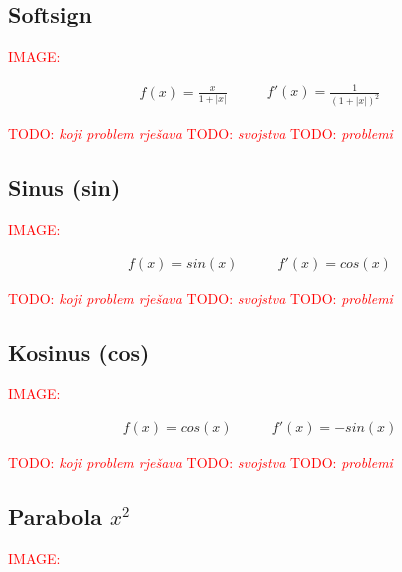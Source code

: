 \documentclass[times, utf8, diplomski]{fer}
\def\TODO#1{\noindent\textcolor{red}{TODO: \textit{#1}}\newline}
\def\todo#1{\TODO{#1}}
\def\todoimg#1{\begin{center} \textcolor{red}{IMAGE: \textit{#1}} \end{center}}
\begin{document}
\subsection*{Softsign}

\todoimg{}

\begin{equation}
\begin{split}
f(x) = \frac{x}{1+|x|}
\end{split}
\qquad
\begin{split}
f'(x) = \frac{1}{(1+|x|)^2}
\end{split}
\end{equation}

\todo{koji problem rješava}
\todo{svojstva}
\todo{problemi}

\subsection*{Sinus (sin)}

\todoimg{}

\begin{equation}
\begin{split}
f(x) = sin(x)
\end{split}
\qquad
\begin{split}
f'(x) = cos(x)
\end{split}
\end{equation}

\todo{koji problem rješava}
\todo{svojstva}
\todo{problemi}

\subsection*{Kosinus (cos)}

\todoimg{}

\begin{equation}
\begin{split}
f(x) = cos(x)
\end{split}
\qquad
\begin{split}
f'(x) = -sin(x)
\end{split}
\end{equation}

\todo{koji problem rješava}
\todo{svojstva}
\todo{problemi}

\subsection*{Parabola $x^2$}

\todoimg{}
\end{document}
